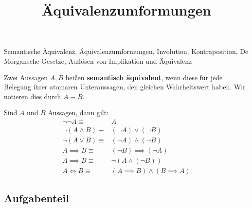 \documentclass{uebungsblatt}
\title{Äquivalenzumformungen}
\begin{document}
\maketitle
\begin{contents}
    Semantische Äquivalenz, Äquivalenzumformungen, Involution, Kontraposition, De Morgansche Gesetze, Auflösen von Implikation und Äquivalenz
\end{contents}


\begin{definition}
    Zwei Aussagen $A,B$ heißen \textbf{semantisch äquivalent}, wenn diese für jede Belegung ihrer atomaren Unteraussagen, den gleichen Wahrheitswert haben. Wir notieren dies durch $A \equiv B$.
\end{definition}

\begin{theorem}
    Sind $A$ und $B$ Aussagen, dann gilt:
    \begin{align*}
        \tag{Involution}
        \lnot \lnot A \equiv& A\\
        \tag{1. De Morgansches Gesetz}
        \lnot (A \land B) \equiv& (\lnot A) \lor (\lnot B)\\
        \tag{2. De Morgansches Gesetz}
        \lnot (A \lor B) \equiv& (\lnot A) \land (\lnot B)\\
        \tag{Kontraposition}
        A \implies B \equiv& (\lnot B) \implies (\lnot A)\\
        \tag{Auflösen der Implikation}
        A \implies B \equiv & \lnot (A \land (\lnot B))\\
        \tag{Auflösen der Äquivalenz}
        A \iff B \equiv & (A \implies B) \land (B \implies A)
    \end{align*}
\end{theorem}

\subsection*{Aufgabenteil}

\end{document}
